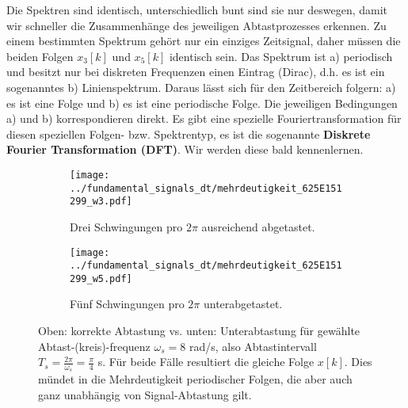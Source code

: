 \begin{ExCalc}
\begin{center}
\end{center}
%
Die Spektren sind identisch, unterschiedlich bunt sind sie nur deswegen,
damit wir schneller die Zusammenhänge des jeweiligen Abtastprozesses erkennen.
%
Zu einem bestimmten Spektrum gehört nur ein einziges Zeitsignal, daher
müssen die beiden Folgen $x_3[k]$ und $x_5[k]$ identisch sein.
%
Das Spektrum ist a) periodisch und besitzt nur bei diskreten Frequenzen einen
Eintrag (Dirac), d.h. es ist ein sogenanntes b) Linienspektrum.
%
Daraus lässt sich für den Zeitbereich folgern: a) es ist eine Folge und b)
es ist eine periodische Folge.
Die jeweiligen Bedingungen a) und b) korrespondieren direkt.
%
Es gibt eine spezielle Fouriertransformation für diesen speziellen Folgen- bzw.
Spektrentyp, es ist die sogenannte \textbf{Diskrete Fourier Transformation (DFT)}.
%
Wir werden diese bald kennenlernen.
%
\end{ExCalc}
%
\begin{figure*}[h]
\centering
\begin{subfigure}{0.75\textwidth}
\texttt{[image: ../fundamental\_signals\_dt/mehrdeutigkeit\_625E151299\_w3.pdf]}
\caption{Drei Schwingungen pro $2\pi$ ausreichend abgetastet.}
\label{fig:mehrdeutigkeit_625E151299_w3}
\end{subfigure}
%
\begin{subfigure}{0.75\textwidth}
\texttt{[image: ../fundamental\_signals\_dt/mehrdeutigkeit\_625E151299\_w5.pdf]}
\caption{Fünf Schwingungen pro $2\pi$ unterabgetastet.}
\label{fig:mehrdeutigkeit_625E151299_w5}
\end{subfigure}
\caption{Oben: korrekte Abtastung vs. unten: Unterabtastung für
gewählte Abtast-(kreis)-frequenz $\omega_s = 8$ rad/s,
also Abtastintervall $T_s = \frac{2\pi}{\omega_s} = \frac{\pi}{4}$ s.
Für beide Fälle resultiert die gleiche Folge $x[k]$. Dies mündet in die
Mehrdeutigkeit periodischer Folgen, die aber auch ganz unabhängig von
Signal-Abtastung gilt.}
\label{fig:mehrdeutigkeit_625E151299}
\end{figure*}


















